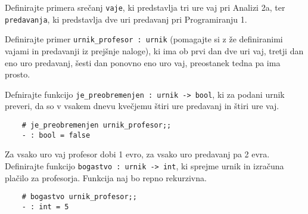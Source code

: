 \documentclass[arhiv]{../izpit}
\begin{document}
	\podnaloga Definirajte primera srečanj \verb|vaje|, ki predstavlja tri ure vaj pri Analizi 2a, ter \verb|predavanja|, ki predstavlja dve uri predavanj pri Programiranju 1.
	
	\podnaloga Definirajte primer \verb|urnik_profesor : urnik| (pomagajte si z že definiranimi vajami in predavanji iz prejšnje naloge), ki ima ob prvi dan dve uri vaj, tretji dan eno uro predavanj, šesti dan ponovno eno uro vaj, preostanek tedna pa ima prosto.
	
	\podnaloga Defnirajte funkcijo \verb|je_preobremenjen : urnik -> bool|, ki za podani urnik preveri, da so v vsakem dnevu kvečjemu štiri ure predavanj in štiri ure vaj.
	
	\begin{verbatim}
	# je_preobremenjen urnik_profesor;;
	- : bool = false
	\end{verbatim}
	
	\podnaloga Za vsako uro vaj profesor dobi 1 evro, za vsako uro predavanj pa 2 evra. Definirajte funkcijo \verb|bogastvo : urnik -> int|, ki sprejme urnik in izračuna plačilo za profesorja. Funkcija naj bo repno rekurzivna.
	
	\begin{verbatim}
	# bogastvo urnik_profesor;;
	- : int = 5
	\end{verbatim}
	
	
\end{document}
